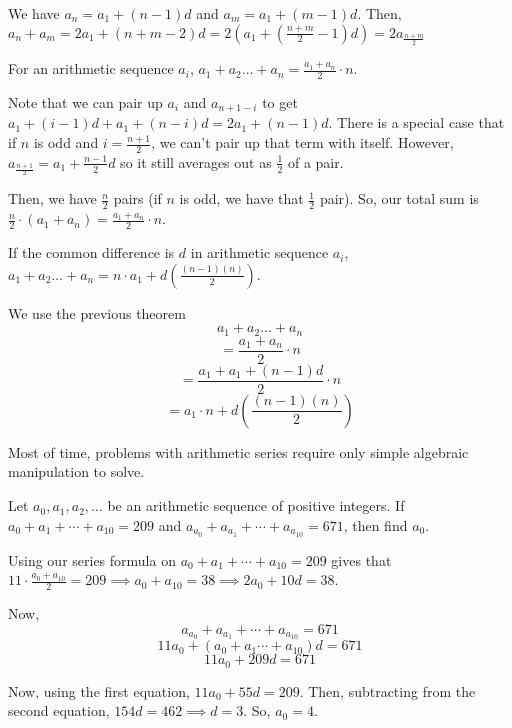 \documentclass[11pt]{article}
\begin{document}
\begin{pro}
We have $a_{n}=a_{1}+(n-1)d$ and $a_{m}=a_{1}+(m-1)d$. Then, $a_{n}+a_{m}=2a_{1}+(n+m-2)d=2(a_{1}+(\frac{n+m}{2}-1)d)=2a_{\frac{n+m}{2}}$
\end{pro}

\begin{theo}
For an arithmetic sequence $a_{i}$, $a_{1}+a_{2}\ldots + a_{n}=\frac{a_{1}+a_{n}}{2}\cdot n$.
\end{theo}

\begin{pro}
Note that we can pair up $a_{i}$ and $a_{n+1-i}$ to get $a_{1}+(i-1)d+a_{1}+(n-i)d=2a_{1}+(n-1)d$. There is a special case that if $n$ is odd and $i=\frac{n+1}{2}$, we can't pair up that term with itself. However, $a_{\frac{n+1}{2}}=a_{1}+\frac{n-1}{2}d$ so it still averages out as $\frac{1}{2}$ of a pair.

Then, we have $\frac{n}{2}$ pairs (if $n$ is odd, we have that $\frac{1}{2}$ pair). So, our total sum is 
$\frac{n}{2}\cdot (a_{1}+a_{n})=\frac{a_{1}+a_{n}}{2}\cdot n$.
\end{pro}

\begin{theo}
If the common difference is $d$ in arithmetic sequence $a_{i}$, $a_{1}+a_{2}\ldots + a_{n}=n\cdot a_{1}+d(\frac{(n-1)(n)}{2})$.
\end{theo}

\begin{pro}
We use the previous theorem 
$$a_{1}+a_{2}\ldots + a_{n}$$
$$=\frac{a_{1}+a_{n}}{2}\cdot n$$
$$=\frac{a_{1}+a_{1}+(n-1)d}{2}\cdot n$$
$$=a_{1}\cdot n + d(\frac{(n-1)(n)}{2})$$
\end{pro}

Most of time, problems with arithmetic series require only simple algebraic manipulation to solve.

\begin{exam}
Let $a_0, a_1, a_2, \ldots$ be an arithmetic sequence of positive integers. If $a_0 + a_1 + \cdots + a_{10} = 209$ and $a_{a_{0}} +
a_{a_{1}} + \cdots + a_{a_{10}} = 671$, then find $a_0$.
\end{exam}

\begin{sol}
Using our series formula on $a_0 + a_1 + \cdots + a_{10} = 209$ gives that $11\cdot \frac{a_{0}+a_{10}}{2}=209\implies a_{0}+a_{10}=38\implies 2a_{0}+10d=38$.

Now,
$$a_{a_{0}}+a_{a_{1}} + \cdots + a_{a_{10}} = 671$$
$$11a_{0}+(a_{0}+a_{1}\cdots + a_{10})d=671$$
$$11a_{0}+209d=671$$

Now, using the first equation, $11a_{0}+55d=209$. Then, subtracting from the second equation, $154d=462\implies d =3$. So, $a_{0}=\boxed{4}$.
\end{sol}
\end{document}
